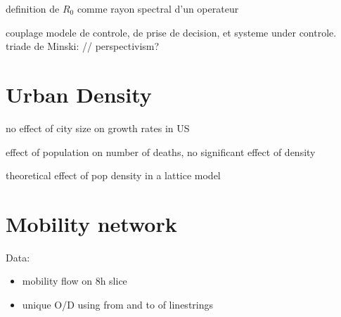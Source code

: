 \documentclass[10pt]{article}
\begin{document}
\cite{bacaer2011parametre} definition de $R_0$ comme rayon spectral d'un operateur

\cite{bonte2011modelisation} couplage modele de controle, de prise de decision, et systeme under controle. triade de Minski: // perspectivism?
	
\section{Urban Density}


\cite{2020arXiv200401248H} no effect of city size on growth rates in US
	
\cite{angel2020coronavirus} effect of population on number of deaths, no significant effect of density

\cite{tarwater2001effects} theoretical effect of pop density in a lattice model	

	
	
\section{Mobility network}
	
Data:

\begin{itemize}
	\item mobility flow on 8h slice
	\item unique O/D using from and to of linestrings
\end{itemize}







	
	
	
	


	
	
\end{document}
